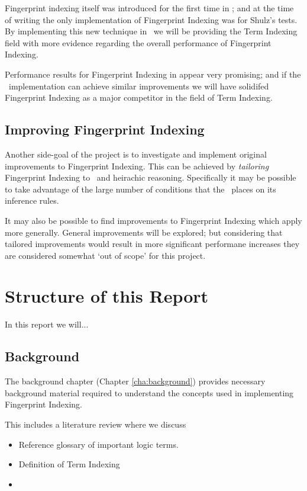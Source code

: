 Fingerprint indexing itself was introduced for the first
time in \cite{shulz12}; and at the time of writing the only
implementation of Fingerprint Indexing was for Shulz's tests. By implementing this new technique in \beagle\ 
we will be providing the Term Indexing field with more evidence regarding the
overall performance of Fingerprint Indexing.

Performance results for Fingerprint Indexing in \cite{shulz12} appear very promising;
and if the \beagle\ implementation can achieve similar improvements we will
have solidifed Fingerprint Indexing as a major competitor in the field of Term Indexing.

\subsection{Improving Fingerprint Indexing}

Another side-goal of the project is to investigate and implement original
improvements to Fingerprint Indexing.
This can be achieved by \emph{tailoring} Fingerprint Indexing to \beagle\ 
and heirachic reasoning. Specifically it may be possible to take
advantage of the large number of conditions that the \HSWAC\ places on
its inference rules.

It may also be possible to find improvements to Fingerprint Indexing which
apply more generally. General improvements will be explored; but considering
that tailored improvements would result in more significant performane increases they
are considered somewhat `out of scope' for this project.

\section{Structure of this Report}
\label{sec:framework}

In this report we will...

\subsection{Background}

The background chapter (Chapter \ref{cha:background}) provides necessary background material required to understand
the concepts used in implementing Fingerprint Indexing.

This includes a literature review where we discuss 
\begin{itemize}
\item Reference glossary of important logic terms.
\item Definition of Term Indexing
\item
\end{itemize}

